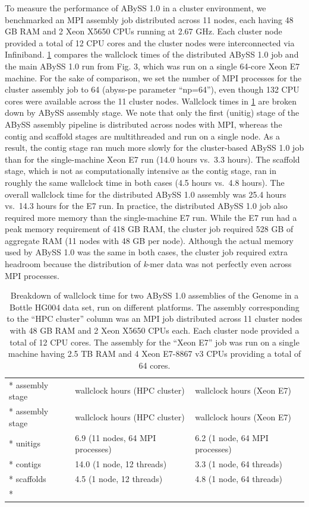 \documentclass[
  12pt,
  oneside,
  openany]{book}
\begin{document}
\begin{appendices}
To measure the performance of ABySS 1.0 in a cluster environment, we benchmarked an MPI assembly job distributed across 11 nodes, each having 48 GB RAM and 2 Xeon X5650 CPUs running at 2.67 GHz. Each cluster node provided a total of 12 CPU cores and the cluster nodes were interconnected via Infiniband. \cref{tbl:cluster} compares the wallclock times of the distributed ABySS 1.0 job and the main ABySS 1.0 run from Fig. 3, which was run on a single 64-core Xeon E7 machine. For the sake of comparison, we set the number of MPI processes for the cluster assembly job to 64 (abyss-pe parameter ``np=64''), even though 132 CPU cores were available across the 11 cluster nodes. Wallclock times in \cref{tbl:cluster} are broken down by ABySS assembly stage. We note that only the first (unitig) stage of the ABySS assembly pipeline is distributed across nodes with MPI, whereas the contig and scaffold stages are multithreaded and run on a single node. As a result, the contig stage ran much more slowly for the cluster-based ABySS 1.0 job than for the single-machine Xeon E7 run (14.0 hours vs.~3.3 hours). The scaffold stage, which is not as computationally intensive as the contig stage, ran in roughly the same wallclock time in both cases (4.5 hours vs.~4.8 hours). The overall wallclock time for the distributed ABySS 1.0 assembly was 25.4 hours vs.~14.3 hours for the E7 run. In practice, the distributed ABySS 1.0 job also required more memory than the single-machine E7 run. While the E7 run had a peak memory requirement of 418 GB RAM, the cluster job required 528 GB of aggregate RAM (11 nodes with 48 GB per node). Although the actual memory used by ABySS 1.0 was the same in both cases, the cluster job required extra headroom because the distribution of \emph{k}-mer data was not perfectly even across MPI processes.

\hypertarget{tbl:cluster}{}
\begin{singlespace}
\small
\begin{longtable}[]{@{}lll@{}}
\caption[Breakdown of wallclock time for two ABySS 1.0 assemblies of the Genome in a Bottle HG004 data set, run on different platforms.]{\label{tbl:cluster}Breakdown of wallclock time for two ABySS 1.0 assemblies of the Genome in a Bottle HG004 data set, run on different platforms. The assembly corresponding to the ``HPC cluster'' column was an MPI job distributed across 11 cluster nodes with 48 GB RAM and 2 Xeon X5650 CPUs each. Each cluster node provided a total of 12 CPU cores. The assembly for the ``Xeon E7'' job was run on a single machine having 2.5 TB RAM and 4 Xeon E7-8867 v3 CPUs providing a total of 64 cores.}\tabularnewline*
\toprule
assembly stage & wallclock hours (HPC cluster) & wallclock hours (Xeon E7)\tabularnewline*
\midrule
\endfirsthead
\toprule
assembly stage & wallclock hours (HPC cluster) & wallclock hours (Xeon E7)\tabularnewline*
\midrule
\endhead
unitigs & 6.9 (11 nodes, 64 MPI processes) & 6.2 (1 node, 64 MPI processes)\tabularnewline*
contigs & 14.0 (1 node, 12 threads) & 3.3 (1 node, 64 threads)\tabularnewline*
scaffolds & 4.5 (1 node, 12 threads) & 4.8 (1 node, 64 threads)\tabularnewline*
\bottomrule
\end{longtable}
\end{singlespace}


\end{appendices}
\end{document}
